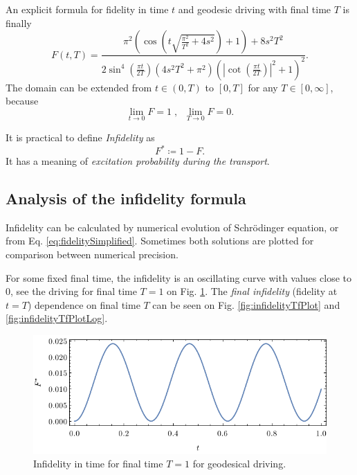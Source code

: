 An explicit formula for fidelity in time $t$ and geodesic driving with final time $T$ is finally
\begin{equation}
    F(t,T)=\frac{\pi ^2 \left(\cos \left(t \sqrt{\frac{\pi ^2}{T^2}+4 s^2}\right)+1\right)+8 s^2 T^2}{2 \sin ^4\left(\frac{\pi  t}{2 T}\right) \left(4 s^2 T^2+\pi ^2\right) \left(\left| \cot \left(\frac{\pi  t}{2 T}\right)\right|^2+1\right)^2}.
    \label{eq:fidelitySimplified}
\end{equation}
The domain can be extended from $t\in(0,T)$ to $[0,T]$ for any $T\in[0,\infty]$, because 
$$
    \lim_{t\rightarrow 0}F=1\; ,\;\; \lim_{T\rightarrow 0}F=0.
$$

It is practical to define \emph{Infidelity} as
\begin{equation}
    F^*\coloneqq 1-F.
\end{equation} 
It has a meaning of \emph{excitation probability during the transport}.


\subsection{Analysis of the infidelity formula}
Infidelity can be calculated by numerical evolution of Schr\"odinger equation, or from Eq. \ref{eq:fidelitySimplified}. Sometimes both solutions are plotted for comparison between numerical precision. 

For some fixed final time, the infidelity is an oscillating curve with values close to $0$, see the driving for final time $T=1$ on Fig. \ref{fig:infidelityTimePlot}. The \emph{final infidelity} (fidelity at $t=T$) dependence on final time $T$ can be seen on Fig. \ref{fig:infidelityTfPlot} and \ref{fig:infidelityTfPlotLog}.
\begin{figure}[H]
    \centering
    \includegraphics[scale=1.2]{../img/infidelityTimePlotGeod.pdf}
    \caption{Infidelity in time for final time $T=1$ for geodesical driving.}
  \label{fig:infidelityTimePlot}
\end{figure}

